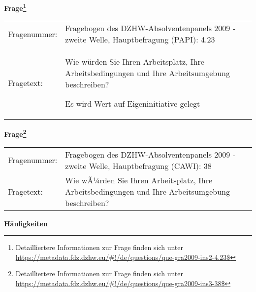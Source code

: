 				\vspace*{0.5cm}
                \noindent\textbf{Frage\footnote{Detailliertere Informationen zur Frage finden sich unter
		              \url{https://metadata.fdz.dzhw.eu/\#!/de/questions/que-gra2009-ins2-4.23$}}}\\
				\begin{tabularx}{\hsize}{@{}lX}
					Fragenummer: &
					  Fragebogen des DZHW-Absolventenpanels 2009 - zweite Welle, Hauptbefragung (PAPI):
					  4.23
 \\
					Fragetext: & Wie würden Sie Ihren Arbeitsplatz, Ihre Arbeitsbedingungen und Ihre Arbeitsumgebung beschreiben?\par  Es wird Wert auf Eigeninitiative gelegt \\
				\end{tabularx}
				\vspace*{0.5cm}
                \noindent\textbf{Frage\footnote{Detailliertere Informationen zur Frage finden sich unter
		              \url{https://metadata.fdz.dzhw.eu/\#!/de/questions/que-gra2009-ins3-38$}}}\\
				\begin{tabularx}{\hsize}{@{}lX}
					Fragenummer: &
					  Fragebogen des DZHW-Absolventenpanels 2009 - zweite Welle, Hauptbefragung (CAWI):
					  38
 \\
					Fragetext: & Wie wÃ¼rden Sie Ihren Arbeitsplatz, Ihre Arbeitsbedingungen und Ihre Arbeitsumgebung beschreiben? \\
				\end{tabularx}





        		\vspace*{0.5cm}
                \noindent\textbf{Häufigkeiten}

